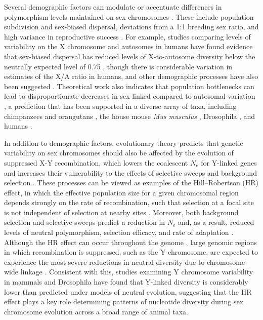 \documentclass[9pt,twocolumn,twoside]{gsajnl}
\begin{document}
Several demographic factors can modulate or accentuate differences in polymorphism levels maintained on sex chromosomes \citep{ellegren2009}. These include population subdivision and sex-biased dispersal, deviations from a 1:1 breeding sex ratio, and high variance in reproductive success \citep{caballero1995,charlesworth2001,laporte2002,pool2007}. For example, studies comparing levels of variability on the X chromosome and autosomes in humans have found evidence that sex-biased dispersal has reduced levels of X-to-autosome diversity below the neutrally expected level of 0.75 \citep{keinan2009}, though there is considerable variation in estimates of the X/A ratio in humans, and other demographic processes have also been suggested \citep{hammer2010,bustamante2009}. Theoretical work also indicates that population bottlenecks can lead to disproportionate decreases in sex-linked compared to autosomal variation \citep{pool2007}, a prediction that has been supported in a diverse array of taxa, including chimpanzees and orangutans \citep{kaessmann2001,fischer2006}, the house mouse \textit{Mus musculus} \citep{baines2007}, Drosophila \citep{andolfatto2001}, and humans \citep{keinan2009}.

In addition to demographic factors, evolutionary theory predicts that genetic variability on sex chromosomes should also be affected by the evolution of suppressed X-Y recombination, which lowers the coalescent $N_{e}$ for Y-linked genes and increases their vulnerability to the effects of selective sweeps \citep{smith1974hitch,aquadro1994} and background selection \citep{charlesworth1996background,charlesworth1994effect}. These processes can be viewed as examples of the Hill–Robertson (HR) effect, in which the effective population size for a given chromosomal region depends strongly on the rate of recombination, such that selection at a focal site is not independent of selection at nearby sites \citep{hill1966HReffect}. Moreover, both background selection and selective sweeps predict a reduction in $N_{e}$ and, as a result, reduced levels of neutral polymorphism, selection efficacy, and rate of adaptation \citep{comeron2008}. Although the HR effect can occur throughout the genome \citep{mcvean2000}, large genomic regions in which recombination is suppressed, such as the Y chromosome, are expected to experience the most severe reductions in neutral diversity due to chromosome-wide linkage \citep{charlesworth1996CB,charlesworth2000degeneration,bachtrog2013NRG}. Consistent with this, studies examining Y chromosome variability in mammals \citep{hellborg2004,Wilsonsayres2014} and Drosophila \citep{mcallister1999,bachtrog2000} have found that Y-linked diversity is considerably lower than predicted under models of neutral evolution, suggesting that the HR effect plays a key role determining patterns of nucleotide diversity during sex chromosome evolution across a broad range of animal taxa.
\end{document}
